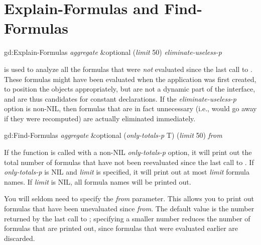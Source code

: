 \section{Explain-Formulas and Find-Formulas}

\begin{programexample}
gd:Explain-Formulas {\it aggregate} \&optional ({\it limit} 50) {\it eliminate-useless-p}\value{function}
\end{programexample}

 is used to analyze all the formulas that were {\it not}
evaluated since the last call to .  These formulas might
have been evaluated when the application was first created, to position the
objects appropriately, but are not a dynamic part of the interface, and are
thus candidates for constant declarations.
If the {\it eliminate-useless-p} option is non-NIL, then formulas that are
in fact unnecessary (i.e., would go away if they were recomputed) are actually
eliminated immediately.


\begin{programexample}
gd:Find-Formulas {\it aggregate} \&optional ({\it only-totals-p} T) ({\it limit} 50) {\it from}\value{function}
\end{programexample}

If the function  is called with a non-NIL {\it only-totals-p}
option, it will print out the total number of formulas that have not
been reevaluated since the last call to .
If {\it only-totals-p} is NIL and {\it limit} is specified,
it will print out at most {\it limit} formula names.  If {\it limit} is NIL,
all formula names will be printed out.

You will seldom need to specify the {\it from} parameter.  This allows you
to print out formulas that have been unevaluated since {\it from}.  The
default value is the number returned by the last call to
; specifying a smaller number reduces the number of
formulas that are printed out, since formulas that were evaluated
earlier are discarded.


